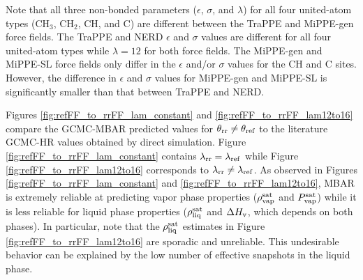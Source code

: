 \documentclass[journal=jced,manuscript=article]{achemso}
\begin{document}
Note that all three non-bonded parameters ($\epsilon$, $\sigma$, and $\lambda$) for all four united-atom types (CH$_3$, CH$_2$, CH, and C) are different between the TraPPE and MiPPE-gen force fields. The TraPPE and NERD $\epsilon$ and $\sigma$ values are different for all four united-atom types while $\lambda = 12$ for both force fields. The MiPPE-gen and MiPPE-SL force fields only differ in the $\epsilon$ and/or $\sigma$ values for the CH and C sites. However, the difference in $\epsilon$ and $\sigma$ values for MiPPE-gen and MiPPE-SL is significantly smaller than that between TraPPE and NERD.


Figures \ref{fig:refFF_to_rrFF_lam_constant} and \ref{fig:refFF_to_rrFF_lam12to16} compare the GCMC-MBAR predicted values for $\theta_{\rm rr} \neq \theta_{\rm ref}$ to the literature GCMC-HR values obtained by direct simulation. Figure \ref{fig:refFF_to_rrFF_lam_constant} contains $\lambda_{\rm rr} = \lambda_{\rm ref}$ while Figure \ref{fig:refFF_to_rrFF_lam12to16} corresponds to $\lambda_{\rm rr} \neq \lambda_{\rm ref}$. As observed in Figures \ref{fig:refFF_to_rrFF_lam_constant} and \ref{fig:refFF_to_rrFF_lam12to16}, MBAR is extremely reliable at predicting vapor phase properties ($\rho_{\rm vap}^{\rm sat}$ and $P_{\rm vap}^{\rm sat}$) while it is less reliable for liquid phase properties ($\rho_{\rm liq}^{\rm sat}$ and $\Delta H_{\rm v}$, which depends on both phases). In particular, note that the $\rho_{\rm liq}^{\rm sat}$ estimates in Figure \ref{fig:refFF_to_rrFF_lam12to16} are sporadic and unreliable. This undesirable behavior can be explained by the low number of effective snapshots in the liquid phase.
%
\end{document}
